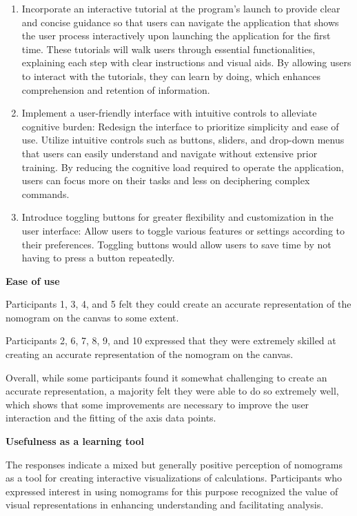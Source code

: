 \documentclass{l4proj}
\begin{document}
\begin{enumerate}
    \item Incorporate an interactive tutorial at the program's launch to provide clear and concise guidance so that users can navigate the application that shows the user process interactively upon launching the application for the first time. These tutorials will walk users through essential functionalities, explaining each step with clear instructions and visual aids. By allowing users to interact with the tutorials, they can learn by doing, which enhances comprehension and retention of information.
    
    \item Implement a user-friendly interface with intuitive controls to alleviate cognitive burden: Redesign the interface to prioritize simplicity and ease of use. Utilize intuitive controls such as buttons, sliders, and drop-down menus that users can easily understand and navigate without extensive prior training. By reducing the cognitive load required to operate the application, users can focus more on their tasks and less on deciphering complex commands.
    
    \item Introduce toggling buttons for greater flexibility and customization in the user interface: Allow users to toggle various features or settings according to their preferences. Toggling buttons would allow users to save time by not having to press a button repeatedly. 

\end{enumerate}


\textbf{Ease of use }

Participants 1, 3, 4, and 5 felt they could create an accurate representation of the nomogram on the canvas to some extent.

Participants 2, 6, 7, 8, 9, and 10 expressed that they were extremely skilled at creating an accurate representation of the nomogram on the canvas.

Overall, while some participants found it somewhat challenging to create an accurate representation, a majority felt they were able to do so extremely well, which shows that some improvements are necessary to improve the user interaction and the fitting of the axis data points. 

\textbf{Usefulness as a learning tool}

The responses indicate a mixed but generally positive perception of nomograms as a tool for creating interactive visualizations of calculations. Participants who expressed interest in using nomograms for this purpose recognized the value of visual representations in enhancing understanding and facilitating analysis.
\end{document}
